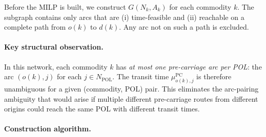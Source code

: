 \documentclass[11pt,a4paper]{article}
\theoremstyle{definition}
\begin{document}
Before the MILP is built, we construct $G(N_k, A_k)$ for each commodity $k$. The subgraph
contains only arcs that are (i) time-feasible and (ii) reachable on a complete path from
$o(k)$ to $d(k)$. Any arc not on such a path is excluded.

\paragraph{Key structural observation.}
In this network, each commodity $k$ has \emph{at most one pre-carriage arc per POL}: the arc
$(o(k), j)$ for each $j \in N_{\text{POL}}$. The transit time $\mu_{o(k),j}^{\text{PC}}$ is
therefore unambiguous for a given (commodity, POL) pair. This eliminates the arc-pairing
ambiguity that would arise if multiple different pre-carriage routes from different origins
could reach the same POL with different transit times.

\paragraph{Construction algorithm.}
\end{document}
